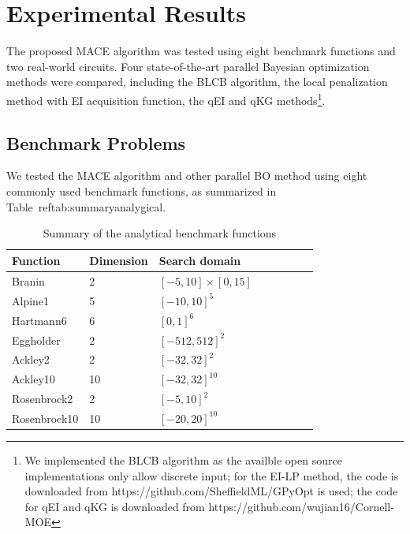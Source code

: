 \section{Experimental Results}

The proposed MACE algorithm was tested using eight benchmark functions and two
real-world circuits. Four state-of-the-art parallel Bayesian optimization
methods were compared, including the BLCB algorithm, the local penalization
method with EI acquisition function, the qEI and qKG methods\footnote{We
implemented the BLCB algorithm as the availble open source implementations only
allow discrete input; for the EI-LP method, the code is downloaded from
https://github.com/SheffieldML/GPyOpt is used; the code for qEI and qKG is
downloaded from https://github.com/wujian16/Cornell-MOE}.

\subsection{Benchmark Problems}

We tested the MACE algorithm and other parallel BO method using eight commonly used benchmark
functions, as summarized in Table~ref{tab:summaryanalygical}.

\begin{table}[htbp]
    \centering
    \caption{Summary of the analytical benchmark functions}
    \label{tab:summaryanalygical}
    \begin{tabular}{llllllll}
        \toprule
         Function           & Dimension        & Search domain             \\ \midrule
         Branin             & 2                & $[-5,  10]\times[0, 15]$  \\
         Alpine1            & 5                & $[-10, 10]^5$             \\
         Hartmann6          & 6                & $[0,   1]^6$              \\
         Eggholder          & 2                & $[-512, 512]^2$           \\
         Ackley2            & 2                & $[-32, 32]^2$             \\
         Ackley10           & 10               & $[-32, 32]^{10}$          \\
         Rosenbrock2        & 2                & $[-5,  10]^2$             \\
         Rosenbrock10       & 10               & $[-20, 20]^{10}$          \\
        \bottomrule
    \end{tabular}
\end{table}

